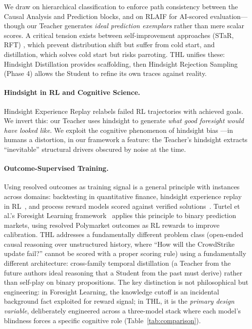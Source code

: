\documentclass[11pt,a4paper]{article}
\begin{document}
We draw on hierarchical classification \cite{giunchiglia2020coherent, redmon2017yolo9000} to enforce path consistency between the Causal Analysis and Prediction blocks, and on RLAIF \cite{bai2022constitutional, lee2023rlaif} for AI-scored evaluation---though our Teacher generates \textit{ideal prediction exemplars} rather than mere scalar scores. A critical tension exists between self-improvement approaches (STaR, RFT) \cite{zelikman2022star, yuan2023rft}, which prevent distribution shift but suffer from cold start, and distillation, which solves cold start but risks parroting. THL unifies these: Hindsight Distillation provides scaffolding, then Hindsight Rejection Sampling (Phase 4) allows the Student to refine its own traces against reality.

\paragraph{Hindsight in RL and Cognitive Science.}
Hindsight Experience Replay \cite{andrychowicz2017hindsight} relabels failed RL trajectories with achieved goals. We invert this: our Teacher uses hindsight to generate \textit{what good foresight would have looked like}. We exploit the cognitive phenomenon of hindsight bias \cite{fischhoff1975hindsight}---in humans a distortion, in our framework a feature: the Teacher's hindsight extracts ``inevitable'' structural drivers obscured by noise at the time.

\paragraph{Outcome-Supervised Training.}
Using resolved outcomes as training signal is a general principle with instances across domains: backtesting in quantitative finance, hindsight experience replay in RL~\cite{andrychowicz2017hindsight}, and process reward models scored against verified solutions~\cite{lightman2023lets}. Turtel et al.'s Foresight Learning framework~\cite{turtel2025selfteach, turtel2025rlvr, turtel2026futureaslabel} applies this principle to binary prediction markets, using resolved Polymarket outcomes as RL rewards to improve calibration. THL addresses a fundamentally different problem class (open-ended causal reasoning over unstructured history, where ``How will the CrowdStrike update fail?'' cannot be scored with a proper scoring rule) using a fundamentally different architecture: cross-family temporal distillation (a Teacher from the future authors ideal reasoning that a Student from the past must derive) rather than self-play on binary propositions. The key distinction is not philosophical but engineering: in Foresight Learning, the knowledge cutoff is an incidental background fact exploited for reward signal; in THL, it is the \emph{primary design variable}, deliberately engineered across a three-model stack where each model's blindness forces a specific cognitive role (Table~\ref{tab:comparison}).
\end{document}
